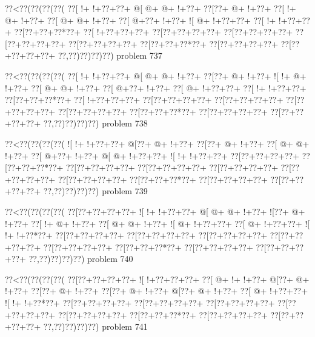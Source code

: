\vbox{\vbox{\goo
\0??<\0??(\0??(\0??(\0??(
\0??[\- !+\- !+\0??+\0??+
\- @[\- @+\- @+\- !+\0??+
\0??[\0??+\- @+\- !+\0??+
\0??[\- !+\- @+\- !+\0??+
\0??[\- @+\- @+\- !+\0??+
\0??[\- @+\0??+\- !+\0??+
\- ![\- @+\- !+\0??+\0??+
\0??[\- !+\- !+\0??+\0??+
\0??[\0??+\0??+\0??*\0??+
\0??[\- !+\0??+\0??+\0??+
\0??[\0??+\0??+\0??+\0??+
\0??[\0??+\0??+\0??+\0??+
\0??[\0??+\0??+\0??+\0??+
\0??[\0??+\0??+\0??+\0??+
\0??[\0??+\0??+\0??*\0??+
\0??[\0??+\0??+\0??+\0??+
\0??[\0??+\0??+\0??+\0??+
\0??,\0??)\0??)\0??)\0??)
}
\hfil problem 737\hfil\break
}

\vbox{\vbox{\goo
\0??<\0??(\0??(\0??(\0??(
\0??[\- !+\- !+\0??+\0??+
\- @[\- @+\- @+\- !+\0??+
\0??[\0??+\- @+\- !+\0??+
\- ![\- !+\- @+\- !+\0??+
\0??[\- @+\- @+\- !+\0??+
\0??[\- @+\0??+\- !+\0??+
\0??[\- @+\- !+\0??+\0??+
\0??[\- !+\- !+\0??+\0??+
\0??[\0??+\0??+\0??*\0??+
\0??[\- !+\0??+\0??+\0??+
\0??[\0??+\0??+\0??+\0??+
\0??[\0??+\0??+\0??+\0??+
\0??[\0??+\0??+\0??+\0??+
\0??[\0??+\0??+\0??+\0??+
\0??[\0??+\0??+\0??*\0??+
\0??[\0??+\0??+\0??+\0??+
\0??[\0??+\0??+\0??+\0??+
\0??,\0??)\0??)\0??)\0??)
}
\hfil problem 738\hfil\break
}

\vbox{\vbox{\goo
\0??<\0??(\0??(\0??(\0??(
\- ![\- !+\- !+\0??+\0??+
\- @[\0??+\- @+\- !+\0??+
\0??[\0??+\- @+\- !+\0??+
\0??[\- @+\- @+\- !+\0??+
\0??[\- @+\0??+\- !+\0??+
\- @[\- @+\- !+\0??+\0??+
\- ![\- !+\- !+\0??+\0??+
\0??[\0??+\0??+\0??+\0??+
\0??[\0??+\0??+\0??*\0??+
\0??[\0??+\0??+\0??+\0??+
\0??[\0??+\0??+\0??+\0??+
\0??[\0??+\0??+\0??+\0??+
\0??[\0??+\0??+\0??+\0??+
\0??[\0??+\0??+\0??+\0??+
\0??[\0??+\0??+\0??*\0??+
\0??[\0??+\0??+\0??+\0??+
\0??[\0??+\0??+\0??+\0??+
\0??,\0??)\0??)\0??)\0??)
}
\hfil problem 739\hfil\break
}

\vbox{\vbox{\goo
\0??<\0??(\0??(\0??(\0??(
\0??[\0??+\0??+\0??+\0??+
\- ![\- !+\- !+\0??+\0??+
\- @[\- @+\- @+\- !+\0??+
\- ![\0??+\- @+\- !+\0??+
\0??[\- !+\- @+\- !+\0??+
\0??[\- @+\- @+\- !+\0??+
\- ![\- @+\- !+\0??+\0??+
\0??[\- @+\- !+\0??+\0??+
\- ![\- !+\- !+\0??*\0??+
\0??[\0??+\0??+\0??+\0??+
\0??[\0??+\0??+\0??+\0??+
\0??[\0??+\0??+\0??+\0??+
\0??[\0??+\0??+\0??+\0??+
\0??[\0??+\0??+\0??+\0??+
\0??[\0??+\0??+\0??*\0??+
\0??[\0??+\0??+\0??+\0??+
\0??[\0??+\0??+\0??+\0??+
\0??,\0??)\0??)\0??)\0??)
}
\hfil problem 740\hfil\break
}

\vbox{\vbox{\goo
\0??<\0??(\0??(\0??(\0??(
\0??[\0??+\0??+\0??+\0??+
\- ![\- !+\0??+\0??+\0??+
\0??[\- @+\- !+\- !+\0??+
\- @[\0??+\- @+\- !+\0??+
\0??[\0??+\- @+\- !+\0??+
\0??[\0??+\- @+\- !+\0??+
\- @[\0??+\- @+\- !+\0??+
\0??[\- @+\- !+\0??+\0??+
\- ![\- !+\- !+\0??*\0??+
\0??[\0??+\0??+\0??+\0??+
\0??[\0??+\0??+\0??+\0??+
\0??[\0??+\0??+\0??+\0??+
\0??[\0??+\0??+\0??+\0??+
\0??[\0??+\0??+\0??+\0??+
\0??[\0??+\0??+\0??*\0??+
\0??[\0??+\0??+\0??+\0??+
\0??[\0??+\0??+\0??+\0??+
\0??,\0??)\0??)\0??)\0??)
}
\hfil problem 741\hfil\break
}


